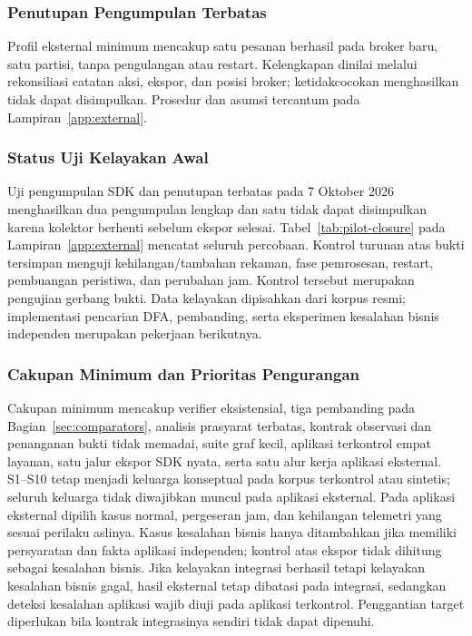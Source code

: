 \subsubsection{Penutupan Pengumpulan Terbatas}
Profil eksternal minimum mencakup satu pesanan berhasil pada broker baru, satu partisi, tanpa pengulangan atau restart. Kelengkapan dinilai melalui rekonsiliasi catatan aksi, ekspor, dan posisi broker; ketidakcocokan menghasilkan tidak dapat disimpulkan. Prosedur dan asumsi tercantum pada Lampiran~\ref{app:external}.

\subsubsection{Status Uji Kelayakan Awal}
\label{sec:feasibility-status}
Uji pengumpulan SDK dan penutupan terbatas pada 7 Oktober 2026 menghasilkan dua pengumpulan lengkap dan satu tidak dapat disimpulkan karena kolektor berhenti sebelum ekspor selesai. Tabel~\ref{tab:pilot-closure} pada Lampiran~\ref{app:external} mencatat seluruh percobaan.
Kontrol turunan atas bukti tersimpan menguji kehilangan/tambahan rekaman, fase pemrosesan, restart, pembuangan peristiwa, dan perubahan jam. Kontrol tersebut merupakan pengujian gerbang bukti. Data kelayakan dipisahkan dari korpus resmi; implementasi pencarian DFA, pembanding, serta eksperimen kesalahan bisnis independen merupakan pekerjaan berikutnya.

\subsubsection{Cakupan Minimum dan Prioritas Pengurangan}
Cakupan minimum mencakup verifier eksistensial, tiga pembanding pada Bagian~\ref{sec:comparators}, analisis prasyarat terbatas, kontrak observasi dan penanganan bukti tidak memadai, suite  graf kecil, aplikasi terkontrol empat layanan, satu jalur ekspor SDK nyata, serta satu alur kerja aplikasi eksternal. S1--S10 tetap menjadi keluarga konseptual pada korpus terkontrol atau sintetis; seluruh keluarga tidak diwajibkan muncul pada aplikasi eksternal. Pada aplikasi eksternal dipilih kasus normal, pergeseran jam, dan kehilangan telemetri yang sesuai perilaku aslinya. Kasus kesalahan bisnis hanya ditambahkan jika memiliki persyaratan dan fakta aplikasi independen; kontrol atas ekspor tidak dihitung sebagai kesalahan bisnis. Jika kelayakan integrasi berhasil tetapi kelayakan kesalahan bisnis gagal, hasil eksternal tetap dibatasi pada integrasi, sedangkan deteksi kesalahan aplikasi wajib diuji pada aplikasi terkontrol. Penggantian target diperlukan bila kontrak integrasinya sendiri tidak dapat dipenuhi.

